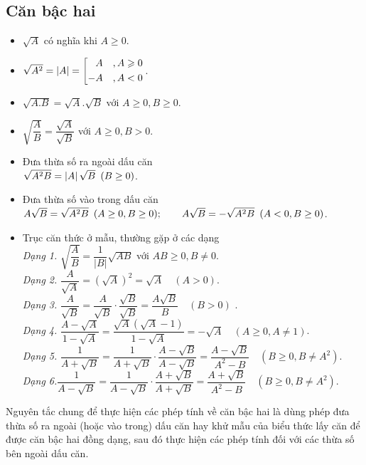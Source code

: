 \subsection{Căn bậc hai}
\begin{itemize}
	\item $\sqrt{A}$ có nghĩa khi $A\geqslant 0$.
	\item $\sqrt{A^2} =\left| A\right| = \left[\begin{aligned}& A&, A\geqslant 0 \\ -&A&, A<0 \end{aligned}\right.$.
	\item $\sqrt{A.B}=\sqrt{A}.\sqrt{B}$ với $A\geqslant 0, B\geqslant 0$.
	\item $\sqrt{\dfrac{A}{B}}=\dfrac{\sqrt{A}}{\sqrt{B}}$ với $A\geqslant 0, B> 0$.
	\item Đưa thừa số ra ngoài dấu căn\\
	$\sqrt{A^2B} =\left| A\right| \sqrt{B} \enskip (B \geq 0)$.
	\item Đưa thừa số vào trong dấu căn\\
	$A\sqrt{B}= \sqrt{A^2B} \enskip (A \geq 0,B \geq 0); \qquad A\sqrt{B}=-\sqrt{A^2B} \enskip (A <0,B \geq 0)$.
	\item Trục căn thức ở mẫu, thường gặp ở các dạng\\
	\textit{Dạng 1.} $\sqrt{\dfrac{A}{B}}=\dfrac{1}{\left| B\right| }\sqrt{AB}$ với $AB\geqslant 0, B\neq 0$.\\
	\textit{Dạng 2.} $\dfrac{A}{\sqrt{A}} ={(\sqrt{A})}^2 =\sqrt{A} \quad (A>0)$.\\
	\textit{Dạng 3.} $\dfrac{A}{\sqrt{B}} =\dfrac{A}{\sqrt{B}} \cdot \dfrac{\sqrt{B}}{\sqrt{B}} =\dfrac{A\sqrt{B}}{B} \quad (B>0)$ .\\
	\textit{Dạng 4.} $\dfrac{A-\sqrt{A}}{1-\sqrt{A}} =\dfrac{\sqrt{A}\left( \sqrt{A} -1\right) }{1-\sqrt{A}} =-\sqrt{A} \quad \left( A \geq 0,A \neq 1\right) $.\\
	\textit{Dạng 5.} $\dfrac{1}{A+\sqrt{B}} =\dfrac{1}{A+\sqrt{B}} \cdot \dfrac{A-\sqrt{B}}{A-\sqrt{B}} =\dfrac{A-\sqrt{B}}{A^2-B} \quad \left( B \geq 0, B\neq A^2 \right) $.\\
	\textit{Dạng 6.}$\dfrac{1}{A-\sqrt{B}} =\dfrac{1}{A-\sqrt{B}} \cdot \dfrac{A+\sqrt{B}}{A+\sqrt{B}} =\dfrac{A+\sqrt{B}}{A^2-B} \quad \left( B \geq 0, B\neq A^2 \right) $.
	
\end{itemize}
Nguyên tắc chung để thực hiện các phép tính về căn bậc hai là dùng phép đưa thừa số ra ngoài (hoặc vào trong) dấu căn hay khử mẫu của biểu thức lấy căn để được căn bậc hai đồng dạng, sau đó thực hiện các phép tính đối với các thừa số bên ngoài dấu căn.
